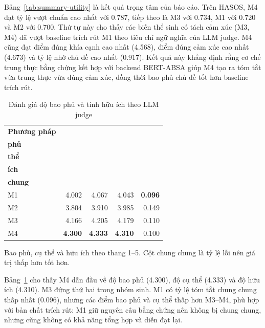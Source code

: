 \documentclass[12pt,a4paper]{report}
\begin{document}
Bảng~\ref{tab:summary-utility} là kết quả trọng tâm của báo cáo. Trên HASOS, M4 đạt tỷ lệ vượt chuẩn cao nhất với \num{0.787}, tiếp theo là M3 với \num{0.734}, M1 với \num{0.720} và M2 với \num{0.700}. Thứ tự này cho thấy các biến thể sinh có tách cảm xúc (M3, M4) đã vượt baseline trích rút M1 theo tiêu chí ngữ nghĩa của LLM judge. M4 cũng đạt điểm đúng khía cạnh cao nhất (\num{4.568}), điểm đúng cảm xúc cao nhất (\num{4.673}) và tỷ lệ nhớ chủ đề cao nhất (\num{0.917}). Kết quả này khẳng định rằng cơ chế trung thực bằng chứng kết hợp với backend BERT-ABSA giúp M4 tạo ra tóm tắt vừa trung thực vừa đúng cảm xúc, đồng thời bao phủ chủ đề tốt hơn baseline trích rút.

\begin{table}[tbp]
\centering
\caption{Đánh giá độ bao phủ và tính hữu ích theo LLM judge}
\label{tab:summary-quality}
\begin{threeparttable}
\begin{tabular}{l r r r r}
\toprule
\textbf{Phương pháp} & \makecell{\textbf{Bao}\\\textbf{phủ}} & \makecell{\textbf{Cụ}\\\textbf{thể}} & \makecell{\textbf{Hữu}\\\textbf{ích}} & \makecell{\textbf{Chung}\\\textbf{chung}} \\
\midrule
M1 & \num{4.002} & \num{4.067} & \num{4.043} & \textbf{\num{0.096}} \\
M2 & \num{3.804} & \num{3.910} & \num{3.985} & \num{0.149} \\
M3 & \num{4.166} & \num{4.205} & \num{4.179} & \num{0.110} \\
M4 & \textbf{\num{4.300}} & \textbf{\num{4.333}} & \textbf{\num{4.310}} & \num{0.100} \\
\bottomrule
\end{tabular}
\begin{tablenotes}
\footnotesize
\item Bao phủ, cụ thể và hữu ích theo thang 1--5. Cột chung chung là tỷ lệ lỗi nên giá trị thấp hơn tốt hơn.
\end{tablenotes}
\end{threeparttable}
\end{table}

Bảng~\ref{tab:summary-quality} cho thấy M4 dẫn đầu về độ bao phủ (\num{4.300}), độ cụ thể (\num{4.333}) và độ hữu ích (\num{4.310}). M3 đứng thứ hai trong nhóm sinh. M1 có tỷ lệ tóm tắt chung chung thấp nhất (\num{0.096}), nhưng các điểm bao phủ và cụ thể thấp hơn M3--M4, phù hợp với bản chất trích rút: M1 giữ nguyên câu bằng chứng nên không bị chung chung, nhưng cũng không có khả năng tổng hợp và diễn đạt lại.
\end{document}
